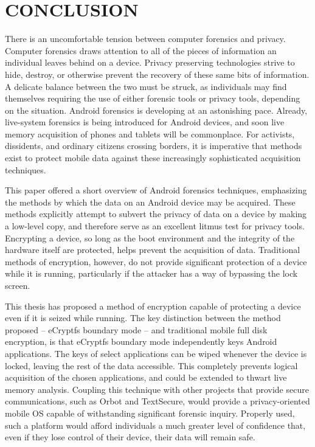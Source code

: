 \chapter{CONCLUSION}
There is an uncomfortable tension between computer forensics and privacy. Computer forensics draws attention to all of the pieces of
information an individual leaves behind on a device.  Privacy preserving technologies strive to hide, destroy, or otherwise prevent
the recovery of these same bits of information. A delicate balance between the two must be struck, as individuals may find
themselves requiring the use of either forensic tools or privacy tools, depending on the situation.  Android forensics is developing
at an astonishing pace.  Already, live-system forensics is being introduced for Android devices, and soon live memory acquisition of
phones and tablets will be commonplace. For activists, dissidents, and ordinary citizens crossing borders, it is imperative that
methods exist to protect mobile data against these increasingly sophisticated acquisition techniques.  

This paper offered a short overview of Android forensics techniques, emphasizing the methods by which the data on an Android device may
be acquired. These methods explicitly attempt to subvert the privacy of data on a device by making a low-level copy, and therefore
serve as an excellent litmus test for privacy tools. Encrypting a device, so long as the boot environment and the integrity of the
hardware itself are protected, helps prevent the acquisition of data. Traditional methods of encryption, however, do not provide
significant protection of a device while it is running, particularly if the attacker has a way of bypassing the lock screen.

This thesis has proposed a method of encryption capable of protecting a device even if it is seized while running.  The key
distinction between the method proposed -- eCryptfs boundary mode -- and traditional mobile full disk encryption, is that eCryptfs
boundary mode independently keys Android applications. The keys of select applications can be wiped whenever the device is locked,
leaving the rest of the data accessible. This completely prevents logical acquisition of the chosen applications, and could be
extended to thwart live memory analysis. Coupling this technique with other projects that provide secure communications, such as
Orbot and TextSecure, would provide a privacy-oriented mobile OS capable of withstanding significant forensic inquiry. Properly
used, such a platform would afford individuals a much greater level of confidence that, even if they lose control of their device,
their data will remain safe.
